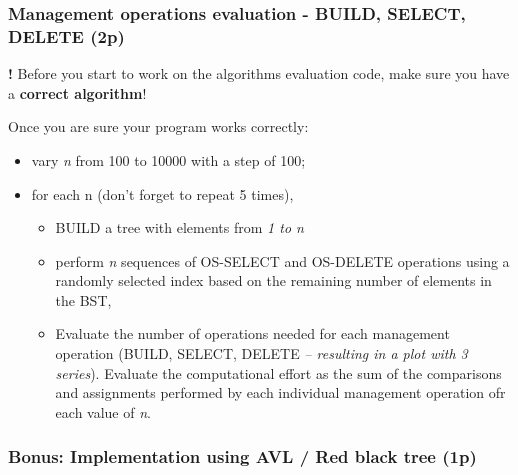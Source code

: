 \documentclass[../en-fa-lab.tex]{subfiles}
\begin{document}
\subsubsection{Management operations evaluation - BUILD, SELECT, DELETE
(2p)}\label{management-operations-evaluation---build-select-delete-2p}

\textbf{!} Before you start to work on the algorithms evaluation code,
make sure you have a \textbf{correct algorithm}!

Once you are sure your program works correctly:

\begin{itemize}
\item
  vary \emph{n} from 100 to 10000 with a step of 100;
\item
  for each n (don't forget to repeat 5 times),

  \begin{itemize}
  \item
    BUILD a tree with elements from \emph{1 to n}
  \item
    perform \emph{n} sequences of OS-SELECT and OS-DELETE operations
    using a randomly selected index based on the remaining number of
    elements in the BST,
  \item
    Evaluate the number of operations needed for each management
    operation (BUILD, SELECT, DELETE \emph{-- resulting in a plot with 3
    series}). Evaluate the computational effort as the sum of the
    comparisons and assignments performed by each individual management
    operation ofr each value of \emph{n}.
  \end{itemize}
\end{itemize}

\subsubsection{Bonus: Implementation using AVL / Red black tree
(1p)}\label{bonus-implementation-using-avl-red-black-tree-1p}
\end{document}
